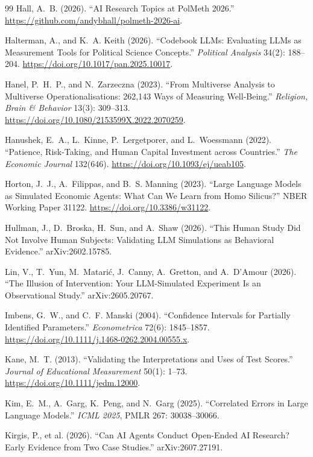 \documentclass[10pt,letterpaper]{article}
\begin{document}
\begin{thebibliography}{99}
 Hall, A.~B. (2026). ``AI Research Topics at PolMeth 2026.'' \url{https://github.com/andybhall/polmeth-2026-ai}.

 Halterman, A., and K.~A. Keith (2026). ``Codebook LLMs: Evaluating LLMs as Measurement Tools for Political Science Concepts.'' \textit{Political Analysis} 34(2): 188--204. \url{https://doi.org/10.1017/pan.2025.10017}.

 Hanel, P.~H.~P., and N.~Zarzeczna (2023). ``From Multiverse Analysis to Multiverse Operationalisations: 262,143 Ways of Measuring Well-Being.'' \textit{Religion, Brain \& Behavior} 13(3): 309--313. \url{https://doi.org/10.1080/2153599X.2022.2070259}.

 Hanushek, E.~A., L.~Kinne, P.~Lergetporer, and L.~Woessmann (2022). ``Patience, Risk-Taking, and Human Capital Investment across Countries.'' \textit{The Economic Journal} 132(646). \url{https://doi.org/10.1093/ej/ueab105}.

 Horton, J.~J., A.~Filippas, and B.~S. Manning (2023). ``Large Language Models as Simulated Economic Agents: What Can We Learn from Homo Silicus?'' NBER Working Paper 31122. \url{https://doi.org/10.3386/w31122}.

 Hullman, J., D.~Broska, H.~Sun, and A.~Shaw (2026). ``This Human Study Did Not Involve Human Subjects: Validating LLM Simulations as Behavioral Evidence.'' arXiv:2602.15785.

 Lin, V., T.~Yun, M.~Matari\'c, J.~Canny, A.~Gretton, and A.~D'Amour (2026). ``The Illusion of Intervention: Your LLM-Simulated Experiment Is an Observational Study.'' arXiv:2605.20767.

 Imbens, G.~W., and C.~F. Manski (2004). ``Confidence Intervals for Partially Identified Parameters.'' \textit{Econometrica} 72(6): 1845--1857. \url{https://doi.org/10.1111/j.1468-0262.2004.00555.x}.

 Kane, M.~T. (2013). ``Validating the Interpretations and Uses of Test Scores.'' \textit{Journal of Educational Measurement} 50(1): 1--73. \url{https://doi.org/10.1111/jedm.12000}.

 Kim, E.~M., A.~Garg, K.~Peng, and N.~Garg (2025). ``Correlated Errors in Large Language Models.'' \textit{ICML 2025}, PMLR 267: 30038--30066.

 Kirgis, P., et al. (2026). ``Can AI Agents Conduct Open-Ended AI Research? Early Evidence from Two Case Studies.'' arXiv:2607.27191.


\end{thebibliography}
\end{document}
